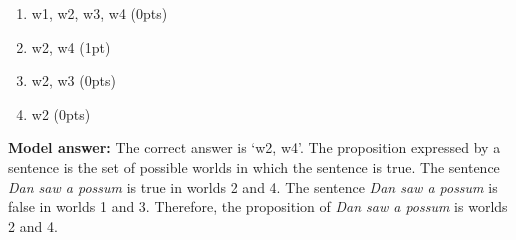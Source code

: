 \documentclass[a4,11pt]{article}
\begin{document}
\begin{enumerate}[leftmargin = 12pt]
\begin{multicols}{2}
\end{multicols}
   
       \begin{enumerate}[noitemsep]
         \item w1, w2, w3, w4 (0pts)
        \item w2, w4 (1pt)
       \item w2, w3 (0pts)
       \item  w2 (0pts)
        \end{enumerate}
   
 {\bf Model answer:} The correct answer is `w2, w4'. The proposition expressed by a sentence is the set of possible worlds in which the sentence is true. The sentence \textit{Dan saw a possum} is true in worlds 2 and 4. The sentence \textit{Dan saw a possum} is false in worlds 1 and 3. Therefore, the proposition of  \textit{Dan saw a possum} is worlds 2 and 4.
              
       \end{enumerate}

        
\end{document}
